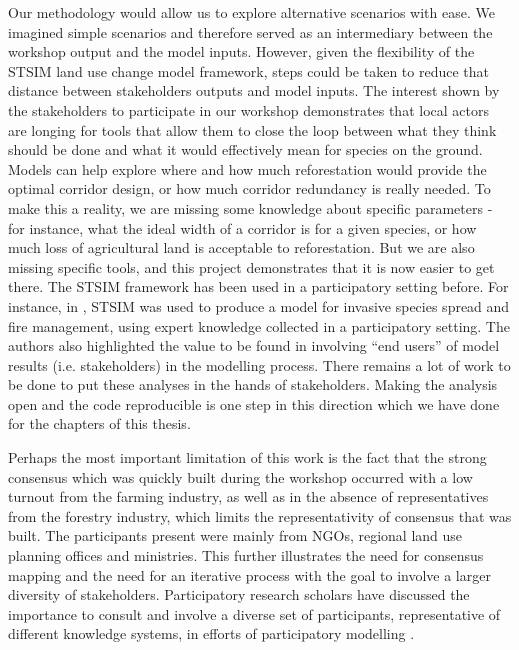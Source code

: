 {Our methodology would allow us to explore alternative scenarios with ease. We imagined simple scenarios and therefore served as an intermediary between the workshop output and the model inputs. However, given the flexibility of the STSIM land use change model framework, steps could be taken to reduce that distance between stakeholders outputs and model inputs. The interest shown by the  stakeholders to participate in our workshop demonstrates that local actors are longing for tools that allow them to close the loop between what they think should be done and what it would effectively mean for species on the ground. Models can help explore where and how much reforestation would provide the optimal corridor design, or how much corridor redundancy is really needed. To make this a reality, we are missing some knowledge about specific parameters - for instance, what the ideal width of a corridor is for a given species, or how much loss of agricultural land is acceptable to reforestation. But we are also missing specific tools, and this project demonstrates that it is now easier to get there. The STSIM framework has been used in a participatory setting before. For instance, in \cite{jarnevich_developing_2019}, STSIM was used to produce a model for invasive species spread and fire management, using expert knowledge collected in a participatory setting. The authors also highlighted the value to be found in involving “end users” of model results (i.e. stakeholders) in the modelling process. There remains a lot of work to be done to put these analyses in the hands of stakeholders. Making the analysis open and the code reproducible is one step in this direction which we have done for the chapters of this thesis.

Perhaps the most important limitation of this work is the fact that the strong consensus which was quickly built during the workshop occurred with a low turnout from the farming industry, as well as in the absence of representatives from the forestry industry, which limits the representativity of consensus that was built. The participants present were mainly from NGOs, regional land use planning offices and ministries. This further illustrates the need for consensus mapping and the need for an iterative process with the goal to involve a larger diversity of stakeholders. Participatory research scholars have discussed the importance to consult and involve a diverse set of participants, representative of different knowledge systems, in efforts of participatory modelling \cite{gray_modeling_2012}. 

}
